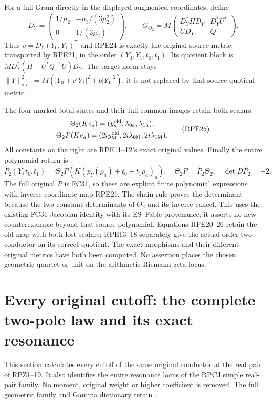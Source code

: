 \documentclass[11pt]{article}
\begin{document}
For a full Gram directly in the displayed augmented coordinates,
define
\[
 D_Y=\begin{pmatrix}
 1/\mu_2&-\mu_3/(3\mu_2^2)\\0&1/(3\mu_2)
 \end{pmatrix},\qquad
 G_{\Theta_2}=M\begin{pmatrix}
 D_Y^*HD_Y&D_Y^*U^*\\UD_Y&Q
 \end{pmatrix}.
 \tag{RPE24}
\]
Thus $v=D_Y(Y_0,Y_1)^{\mathsf T}$ and RPE24 is exactly the
original source metric transported by RPE21, in the order
$(Y_0,Y_1,t_0,t_1)$. Its quotient block is
$M D_Y^*(H-U^*Q^{-1}U)D_Y$.
The target norm stays
$\|Y\|_{s,c'}^2=M(|Y_0+c'Y_1|^2+b|Y_1|^2)$; it is not
replaced by that source quotient metric.

The four marked total states and their full common images retain
both scalars:
\[
 \begin{gathered}
 \Theta_2(Ke_a)=(y_a^{\rm old},\lambda_{0a},\lambda_{1a}),\\
 \Theta_2P(Ke_a)
   =(2i y_{\mathrm M}^{\rm old},
          2i\lambda_{0\mathrm M},2i\lambda_{1\mathrm M}).
 \end{gathered}\tag{RPE25}
\]
All constants on the right are RPE11--12's exact original values.
Finally the entire polynomial return is
\[
 \widehat P_2(Y,t_0,t_1)
  =\Theta_2P\!\left(K(p_Y(\rho_a)+t_0+t_1\rho_a)_a\right),
 \quad \Theta_2P=\widehat P_2\Theta_2,
 \quad\det D\widehat P_2=-2.
 \tag{RPE26}
\]
The full original $P$ is FC31, so these are explicit finite
polynomial expressions with inverse coordinate map RPE21.
The chain rule proves the determinant because the two constant
determinants of $\Theta_2$ and its inverse cancel. This uses the
existing FC31 Jacobian identity with its ES--Fable provenance; it
asserts no new counterexample beyond that source polynomial.
Equations RPE20--26 retain the old map with both lost scalars;
RPE13--18 separately give the actual order-two conductor on its
correct quotient. The exact morphisms and their different original
metrics have both been computed.
No assertion places the chosen geometric quartet or unit on the
arithmetic Riemann-zeta locus.

\section{Every original cutoff: the complete two-pole law and its exact resonance}
This section calculates every cutoff of the same original conductor
at the real pair of RPZ1--19. It also identifies the entire resonance
locus of the RPCJ simple real-pair family. No moment, original weight
or higher coefficient is removed. The full geometric family and
Gamma dictionary retain \cite{PCLOriginal,WCF,DLMF18Source}.
\end{document}
